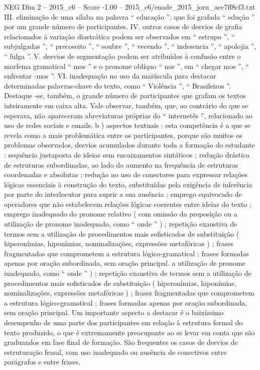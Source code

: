 \begin{textsample}{NEG Dim 2 – 2015\_c6 – Score -1.00 – 2015\_c6/enade\_2015\_jorn\_aec7ff8cf3.txt}
III. eliminação de uma sílaba na palavra “ educação ”, que foi grafada “ edução ” por um grande número de participantes.
IV. outros casos de desvios de grafia relacionados à variação diastrática podem ser observados em “ estrupo ”, “ subjulgadas ”, “ precoseito ”, “ soubre ”, “ vecendo ”, “ indesencia ”, “ apolojia ”, “ fulga ”.
V. desvios de segmentação podem ser atribuídos à confusão entre o morfema gramatical “ mos ” e o pronome oblíquo “ nos ”, em “ chegar mos ”, “ enfrentar -mos ”.
VI. inadequação no uso da maiúscula para destacar determinadas palavras-chave do texto, como “ Violência ”, “ Brasileiros ”.
Destaque -se, também, o grande número de participantes que grafam os textos inteiramente em caixa alta.
Vale observar, também, que, ao contrário do que se esperava, não apareceram abreviaturas próprias do “ internetês ”, relacionado ao uso de redes sociais e emails. b ) aspectos textuais : esta competência é a que se revela como a mais problemática entre os participantes, porque são muitos os problemas observados, desvios acumulados durante toda a formação do estudante : sequência justaposta de ideias sem encaixamentos sintáticos ; redução drástica de estruturas subordinadas, ao lado do aumento na frequência de estruturas coordenadas e absolutas ; redução no uso de conectores para expressar relações lógicas essenciais à construção do texto, substituídas pela exigência de inferência por parte do interlocutor para suprir a sua ausência ; emprego equivocado de operadores que não estabelecem relações lógicas coerentes entre ideias do texto ; emprego inadequado do pronome relativo ( com omissão da preposição ou a utilização de pronome inadequado, como “ onde ” ) ; repetição exaustiva de termos sem a utilização de procedimentos mais sofisticados de substituição ( hiperonímias, hiponímias, nominalizações, expressões metafóricas ) ; frases fragmentadas que comprometem a estrutura lógico-gramatical ; frases formadas apenas por oração subordinada, sem oração principal. a utilização de pronome inadequado, como “ onde ” ) ; repetição exaustiva de termos sem a utilização de procedimentos mais sofisticados de substituição ( hiperonímias, hiponímias, nominalizações, expressões metafóricas ) ; frases fragmentadas que comprometem a estrutura lógico-gramatical ; frases formadas apenas por oração subordinada, sem oração principal.
Um importante aspecto a destacar é o baixíssimo desempenho de uma parte dos participantes em relação à estrutura formal do texto produzido, o que é extremamente preocupante ao se levar em conta que são graduandos em fase final de formação.
São frequentes os casos de desvios de estruturação frasal, com uso inadequado ou ausência de conectivos entre parágrafos e entre frases.

\end{textsample}
